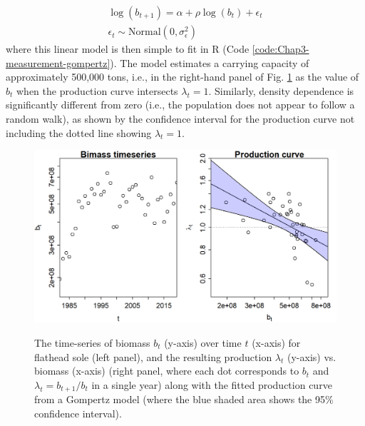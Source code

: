 \begin{equation} \label{eq:Chap3_process_error_Gompertz}
\begin{gathered}
    \log(b_{t+1}) = \alpha + \rho \log(b_{t}) + \epsilon_{t} \\
    \epsilon_{t} \sim \mathrm{Normal} (0, \sigma_{\epsilon}^2)
\end{gathered}
\end{equation}
where this linear model is then simple to fit in R (Code \ref{code:Chap3-measurement-gompertz}).  The model estimates a carrying capacity of approximately 500,000 tons, i.e., in the right-hand panel of Fig. \ref{fig:Chap3_gompertz_data} as the value of \(b_t\) when the production curve intersects \(\lambda_t=1\).  Similarly, density dependence is significantly different from zero (i.e., the population does not appear to follow a random walk), as shown by the confidence interval for the production curve not including the dotted line showing \(\lambda_t=1\).

\lstset{style=Rcode}


\begin{figure}[!ht]
    \caption[Abundance for flathead sole using Gompertz process-error model]{The time-series of biomass \(b_t\) (y-axis) over time \(t\) (x-axis) for flathead sole (left panel), and the resulting production \(\lambda_t\) (y-axis) vs. biomass (x-axis) (right panel, where each dot corresponds to \(b_t\) and \(\lambda_t = b_{t+1}/b_t\) in a single year) along with the fitted production curve from a Gompertz model (where the blue shaded area shows the 95\% confidence interval).}
    \centering
    \includegraphics[width=5.5in]{Chap_3/gompertz_data.png}
    \label{fig:Chap3_gompertz_data}
\end{figure}

